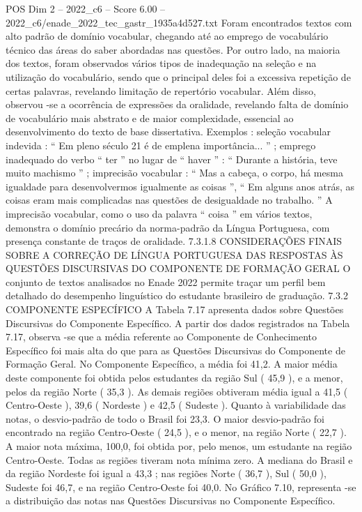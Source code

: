 \begin{textsample}{POS Dim 2 – 2022\_c6 – Score 6.00 – 2022\_c6/enade\_2022\_tec\_gastr\_1935a4d527.txt}
Foram encontrados textos com alto padrão de domínio vocabular, chegando até ao emprego de vocabulário técnico das áreas do saber abordadas nas questões.
Por outro lado, na maioria dos textos, foram observados vários tipos de inadequação na seleção e na utilização do vocabulário, sendo que o principal deles foi a excessiva repetição de certas palavras, revelando limitação de repertório vocabular.
Além disso, observou -se a ocorrência de expressões da oralidade, revelando falta de domínio de vocabulário mais abstrato e de maior complexidade, essencial ao desenvolvimento do texto de base dissertativa.
Exemplos : seleção vocabular indevida : “ Em pleno século 21 é de emplena importância... ” ; emprego inadequado do verbo “ ter ” no lugar de “ haver ” : “ Durante a história, teve muito machismo ” ; imprecisão vocabular : “ Mas a cabeça, o corpo, há mesma igualdade para desenvolvermos igualmente as coisas ”, “ Em alguns anos atrás, as coisas eram mais complicadas nas questões de desigualdade no trabalho. ” A imprecisão vocabular, como o uso da palavra “ coisa ” em vários textos, demonstra o domínio precário da norma-padrão da Língua Portuguesa, com presença constante de traços de oralidade. 7.3.1.8 CONSIDERAÇÕES FINAIS SOBRE A CORREÇÃO DE LÍNGUA PORTUGUESA DAS RESPOSTAS ÀS QUESTÕES DISCURSIVAS DO COMPONENTE DE FORMAÇÃO GERAL O conjunto de textos analisados no Enade 2022 permite traçar um perfil bem detalhado do desempenho linguístico do estudante brasileiro de graduação. 7.3.2 COMPONENTE ESPECÍFICO A Tabela 7.17 apresenta dados sobre Questões Discursivas do Componente Específico.
A partir dos dados registrados na Tabela 7.17, observa -se que a média referente ao Componente de Conhecimento Específico foi mais alta do que para as Questões Discursivas do Componente de Formação Geral.
No Componente Específico, a média foi 41,2.
A maior média deste componente foi obtida pelos estudantes da região Sul ( 45,9 ), e a menor, pelos da região Norte ( 35,3 ).
As demais regiões obtiveram média igual a 41,5 ( Centro-Oeste ), 39,6 ( Nordeste ) e 42,5 ( Sudeste ).
Quanto à variabilidade das notas, o desvio-padrão de todo o Brasil foi 23,3.
O maior desvio-padrão foi encontrado na região Centro-Oeste ( 24,5 ), e o menor, na região Norte ( 22,7 ).
A maior nota máxima, 100,0, foi obtida por, pelo menos, um estudante na região Centro-Oeste.
Todas as regiões tiveram nota mínima zero.
A mediana do Brasil e da região Nordeste foi igual a 43,3 ; nas regiões Norte ( 36,7 ), Sul ( 50,0 ), Sudeste foi 46,7, e na região Centro-Oeste foi 40,0.
No Gráfico 7.10, representa -se a distribuição das notas nas Questões Discursivas no Componente Específico.

\end{textsample}
